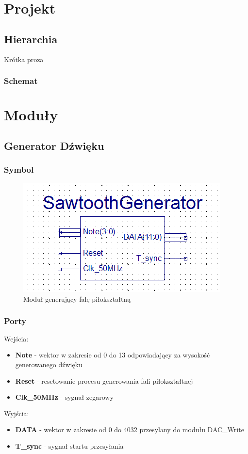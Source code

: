 \documentclass[a4paper]{report}
\begin{document}
\chapter{Projekt}
	\section{Hierarchia}
	Krótka proza
		\subsection{Schemat}
\chapter{Moduły}
	\section{Generator Dźwięku}
		\subsection{Symbol}
			\begin{figure}[h!]
				\centering
				\includegraphics{sawtoothgenerator2.png}
				\caption{Moduł generujący falę piłokształtną}
			\end{figure}
		\subsection{Porty}
		{\Large Wejścia:}
			\begin{itemize}	 
				\item \textbf{Note} - wektor w zakresie od 0 do 13 odpowiadający za wysokość generowanego dźwięku
				\item \textbf{Reset} - resetowanie procesu generowania fali piłokształtnej
				\item \textbf{Clk\_50MHz} - sygnał zegarowy
			\end{itemize}
		{\Large Wyjścia:}
			\begin{itemize} 
				\item \textbf{DATA} - wektor w zakresie od 0 do 4032 przesylany do modułu DAC\_Write
				\item \textbf{T\_sync} - sygnał startu przesyłania
			\end{itemize}
\end{document}
